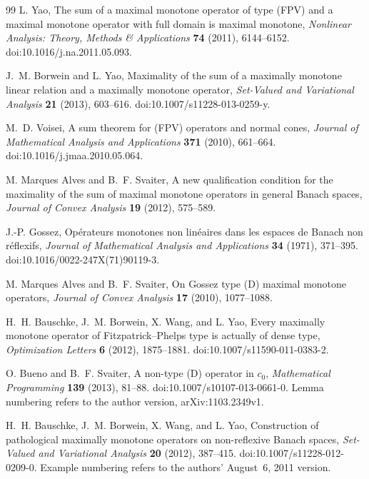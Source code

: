 \begin{thebibliography}{99}
L. Yao,
The sum of a maximal monotone operator of type (FPV) and a maximal
monotone operator with full domain is maximal monotone,
\emph{Nonlinear Analysis: Theory, Methods \& Applications}
\textbf{74} (2011), 6144--6152.
doi:10.1016/j.na.2011.05.093.

J.~M. Borwein and L. Yao,
Maximality of the sum of a maximally monotone linear relation and a
maximally monotone operator,
\emph{Set-Valued and Variational Analysis} \textbf{21} (2013), 603--616.
doi:10.1007/s11228-013-0259-y.

M.~D. Voisei,
A sum theorem for (FPV) operators and normal cones,
\emph{Journal of Mathematical Analysis and Applications}
\textbf{371} (2010), 661--664.
doi:10.1016/j.jmaa.2010.05.064.

M. Marques Alves and B.~F. Svaiter,
A new qualification condition for the maximality of the sum of maximal
monotone operators in general Banach spaces,
\emph{Journal of Convex Analysis} \textbf{19} (2012), 575--589.

J.-P. Gossez,
Op\'{e}rateurs monotones non lin\'{e}aires dans les espaces de Banach non r\'{e}flexifs,
\emph{Journal of Mathematical Analysis and Applications}
\textbf{34} (1971), 371--395.
doi:10.1016/0022-247X(71)90119-3.

M. Marques Alves and B.~F. Svaiter,
On Gossez type (D) maximal monotone operators,
\emph{Journal of Convex Analysis} \textbf{17} (2010), 1077--1088.

H.~H. Bauschke, J.~M. Borwein, X. Wang, and L. Yao,
Every maximally monotone operator of Fitzpatrick--Phelps type is actually
of dense type,
\emph{Optimization Letters} \textbf{6} (2012), 1875--1881.
doi:10.1007/s11590-011-0383-2.

O. Bueno and B.~F. Svaiter,
A non-type (D) operator in $c_0$,
\emph{Mathematical Programming} \textbf{139} (2013), 81--88.
doi:10.1007/s10107-013-0661-0.
Lemma numbering refers to the author version, arXiv:1103.2349v1.

H.~H. Bauschke, J.~M. Borwein, X. Wang, and L. Yao,
Construction of pathological maximally monotone operators on
non-reflexive Banach spaces,
\emph{Set-Valued and Variational Analysis} \textbf{20} (2012), 387--415.
doi:10.1007/s11228-012-0209-0.
Example numbering refers to the authors' August~6, 2011 version.


\end{thebibliography}
